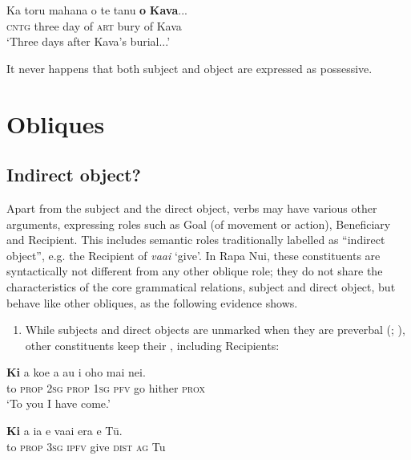 \ea\label{ex:8.167}
\gll Ka toru mahana o te tanu \textbf{o} \textbf{Kava}...\\
\textsc{cntg} three day of \textsc{art} bury of Kava\\

\glt
‘Three days after Kava’s burial...’ \textstyleExampleref{[R229.358]} 
\z

It never happens that both subject and object are expressed as possessive.

\section{Obliques}\label{sec:8.8}
\subsection{Indirect object?}\label{sec:8.8.1}
Apart from the subject and the direct object, verbs may have various other arguments, expressing roles such as Goal (of movement or action), Beneficiary and Recipient. This includes semantic roles traditionally labelled as “indirect object”, e.g. the Recipient of \textit{\mbox{va{\ꞌ}ai}} ‘give’. In Rapa Nui, these constituents are syntactically not different from any other oblique role; they do not share the characteristics of the core grammatical relations, subject and direct object, but behave like other obliques, as the following evidence shows.

\begin{enumerate}
\item 
While subjects and direct objects are unmarked when they are preverbal (; ), other constituents keep their , including Recipients:

\end{enumerate}
\ea\label{ex:8.168}
\gll \textbf{Ki} a koe a au i oho mai nei.\\
to \textsc{prop} \textsc{2sg} \textsc{prop} \textsc{1sg} \textsc{pfv} go hither \textsc{prox}\\

\glt 
‘To you I have come.’ \textstyleExampleref{[R617.181]} 
\z

\ea\label{ex:8.169}
\gll \textbf{Ki} a ia e va{\ꞌ}ai era e Tū. \\
to \textsc{prop} \textsc{3sg} \textsc{ipfv} give \textsc{dist} \textsc{ag} Tu \\

